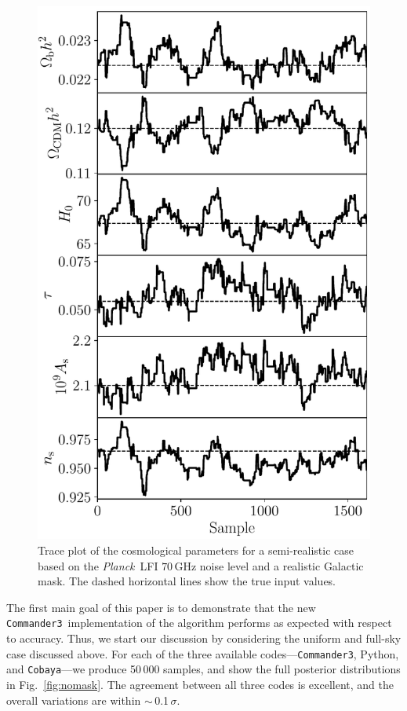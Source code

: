 \documentclass[twocolumn]{../common/aa}
\def\Planck{\emph{Planck}}
\def\commanderthree{\texttt{Commander3}}
\def\cobaya{\texttt{Cobaya}}
\begin{document}
\begin{figure}
	\centering
	\includegraphics[width=\linewidth]{figures/realistic_chain.pdf}
	\caption{\label{fig:traceplot}Trace plot of the cosmological parameters for a semi-realistic case based on the \Planck\ LFI $70\,$GHz noise level and a realistic Galactic mask. The dashed horizontal lines show the true input values.}
\end{figure}


The first main goal of this paper is to demonstrate that the new \commanderthree\ implementation of the \citet{racine:2016} algorithm performs as expected with respect to accuracy. Thus, we start our discussion by considering the uniform and full-sky case discussed above. For each of the three available codes---\commanderthree, Python, and \cobaya---we produce 50\,000 samples, and show the full posterior distributions in Fig.~\ref{fig:nomask}. The agreement between all three codes is excellent, and the overall variations are within $\sim$\,0.1$\,\sigma$.
\end{document}
